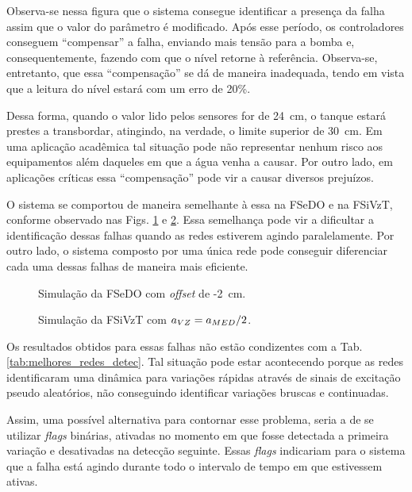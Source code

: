 Observa-se nessa figura que o sistema consegue identificar a presença da falha
assim que o valor do parâmetro é modificado. Após esse período, os controladores
conseguem ``compensar'' a falha, enviando mais tensão para a bomba e,
consequentemente, fazendo com que o nível retorne à referência. Observa-se,
entretanto, que essa ``compensação'' se dá de maneira inadequada, tendo em vista
que a leitura do nível estará com um erro de 20\%. 

Dessa forma, quando o valor lido pelos sensores for de 24\ cm, o tanque estará
prestes a transbordar, atingindo, na verdade, o limite superior de 30\ cm. Em
uma aplicação acadêmica tal situação pode não representar nenhum risco aos
equipamentos além daqueles em que a água venha a causar. Por outro lado, em
aplicações críticas essa ``compensação'' pode vir a causar diversos prejuízos.

O sistema se comportou de maneira semelhante à essa na FSeDO e na FSiVzT,
conforme observado nas Figs. \ref{fig:fsedo} e \ref{fig:fsivzt}. Essa semelhança
pode vir a dificultar a identificação dessas falhas quando as redes estiverem
agindo paralelamente. Por outro lado, o sistema composto por uma única rede pode
conseguir diferenciar cada uma dessas falhas de maneira mais eficiente. 

\begin{figure}[htb]
\footnotesize
\centering

\vspace{1cm}
\caption{Simulação da FSeDO com {\it offset} de -2\ cm.}
\label{fig:fsedo}
\end{figure}

\begin{figure}[htb]
\footnotesize
\centering

\vspace{1cm}
\caption{Simulação da FSiVzT com $a_{\tiny VZ} = a_{\tiny MED}/2$.}
\label{fig:fsivzt}
\end{figure}

Os resultados obtidos para essas falhas não estão condizentes com a Tab.
\ref{tab:melhores_redes_detec}. Tal situação pode estar acontecendo porque as
redes identificaram uma dinâmica para variações rápidas através de sinais de
excitação pseudo aleatórios, não conseguindo identificar variações bruscas e
continuadas.

Assim, uma possível alternativa para contornar esse problema, seria a de se
utilizar {\it flags} binárias, ativadas no momento em que fosse detectada a
primeira variação e desativadas na detecção seguinte. Essas {\it flags}
indicariam para o sistema que a falha está agindo durante todo o intervalo de
tempo em que estivessem ativas.

